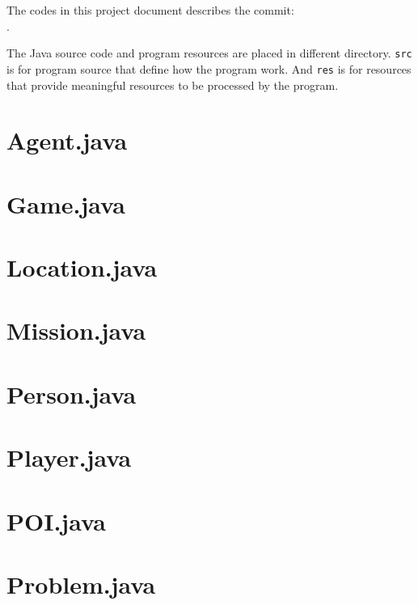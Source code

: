 \documentclass[letterpaper, 12pt]{report}
\begin{document}
The codes in this project document describes the commit:\\ \indent\indent
\texttt{}.

The Java source code and program resources are placed in different directory.
\texttt{src} is for program source that define how the program work. And
\texttt{res} is for resources that provide meaningful resources to be processed
by the program.

\section{Agent.java}


\section{Game.java}


\section{Location.java}


\section{Mission.java}


\section{Person.java}


\section{Player.java}


\section{POI.java}


\section{Problem.java}

\end{document}
